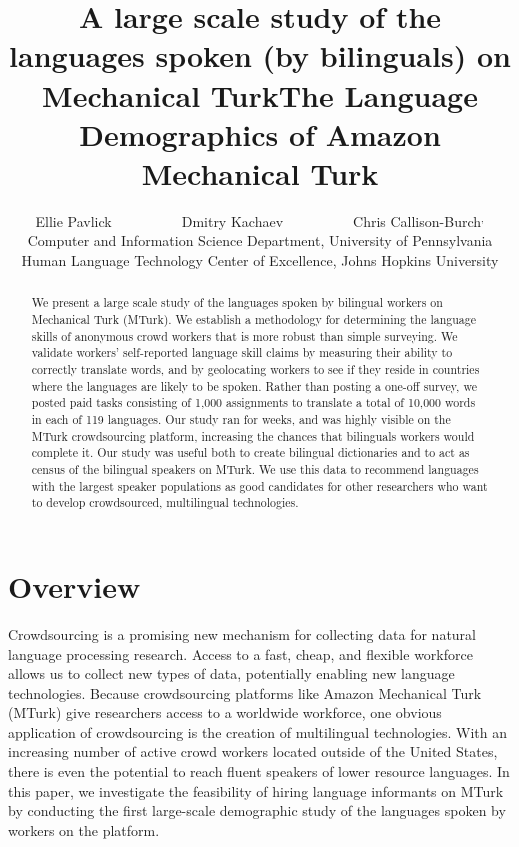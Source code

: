 \documentclass[11pt]{article}
\title{A large scale study of the languages spoken (by bilinguals) on Mechanical Turk}
\title{The Language Demographics of  Amazon Mechanical Turk}
\author{Ellie Pavlick\affliationPenn \ \ \ \ \ \ \ \ \ \ Dmitry Kachaev\affliationJHU \ \ \ \ \ \ \ \ \ \  Chris Callison-Burch\affliationPenn$^{,}$\affliationJHU \\
\affliationPenn Computer and Information Science Department, University of Pennsylvania \\
\affliationJHU Human Language Technology Center of Excellence, Johns Hopkins University \\
  }
\date{}
\begin{document}
\maketitle

\begin{abstract}
We present a large scale study of the languages spoken by bilingual workers on Mechanical Turk (MTurk).  
We establish a  methodology for determining the language skills of anonymous crowd workers that is more robust than simple surveying.  We validate workers' self-reported language skill claims by measuring their ability to correctly translate words, and by geolocating workers to see if they reside in countries where the languages are likely to be spoken. Rather than posting a one-off survey, we posted paid tasks consisting of 1,000 assignments to translate a total of 10,000 words in each of 119 languages.  Our study ran for weeks, and was highly visible on the MTurk crowdsourcing platform, increasing the chances that bilinguals workers would complete it.  Our study was useful both to create bilingual dictionaries and to act as census of the bilingual speakers on MTurk.  We use this data to recommend languages with the largest speaker populations as good candidates for other researchers who want to  develop crowdsourced, multilingual technologies.

\end{abstract}

\section{Overview}
Crowdsourcing is a promising new mechanism for collecting data for natural language processing research. Access to a fast, cheap, and flexible workforce allows us to collect new types of data, potentially enabling new language technologies.
Because crowdsourcing platforms like Amazon Mechanical Turk (MTurk) give researchers access to a worldwide workforce, one obvious application of crowdsourcing is the creation of multilingual technologies. 
With an increasing number of active crowd workers located outside of the United States, there is even the potential to reach fluent speakers of lower resource languages.
In this paper, we investigate the feasibility of hiring language informants on MTurk by conducting the first large-scale demographic study of the languages spoken by workers on the platform. 
\end{document}
